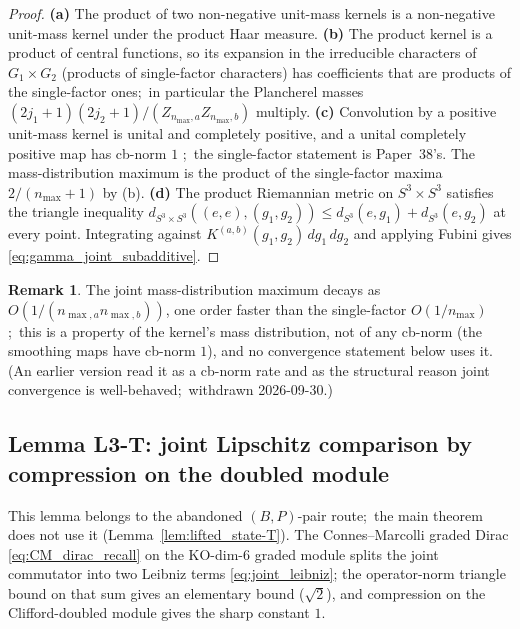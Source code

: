 \documentclass[11pt,a4paper]{article}
\theoremstyle{plain}
\theoremstyle{definition}
\newtheorem{remark}[theorem]{Remark}
\newcommand{\nmax}{n_{\max}}
\newcommand{\nmaxa}{n_{\max,a}}
\newcommand{\nmaxb}{n_{\max,b}}
\newcommand{\sthree}{S^{3}}
\newcommand{\KS}{K}
\begin{document}
\begin{proof}
\textbf{(a)} The product of two non-negative unit-mass kernels is a
non-negative unit-mass kernel under the product Haar measure.
\textbf{(b)} The product kernel is a product of central functions, so
its expansion in the irreducible characters of $G_1 \times G_2$
(products of single-factor characters) has coefficients that are
products of the single-factor ones;\ in particular the Plancherel
masses $(2j_1+1)(2j_2+1)/(Z_{\nmax,a} Z_{\nmax,b})$ multiply.
\textbf{(c)} Convolution by a positive unit-mass kernel is unital
and completely positive, and a unital completely positive map has
cb-norm $1$ \cite[Prop.~3.6]{paulsen2002};\ the single-factor statement is Paper~38's.
The mass-distribution maximum is the product of the single-factor
maxima $2/(\nmax + 1)$ by (b).
\textbf{(d)} The product Riemannian metric on $\sthree \times \sthree$
satisfies the triangle inequality $d_{\sthree \times \sthree}((e,e),
(g_1, g_2)) \le d_{\sthree}(e, g_1) + d_{\sthree}(e, g_2)$ at every
point. Integrating against $\KS^{(a,b)}(g_1, g_2) \,dg_1 \,dg_2$ and
applying Fubini gives \eqref{eq:gamma_joint_subadditive}.
\end{proof}

\begin{remark}\label{rem:cb_norm_rate}
The joint mass-distribution maximum decays as
$O(1/(\nmaxa \nmaxb))$, one order faster than the single-factor
$O(1/\nmax)$;\ this is a property of the kernel's mass distribution,
not of any cb-norm (the smoothing maps have cb-norm $1$), and no
convergence statement below uses it.  (An earlier version read it as
a cb-norm rate and as the structural reason joint convergence is
well-behaved;\ withdrawn 2026-09-30.)
\end{remark}

\subsection{Lemma L3-T: joint Lipschitz comparison by compression on the
doubled module}\label{sec:L3-T}

This lemma belongs to the abandoned $(B,P)$-pair route;\ the main
theorem does not use it (Lemma~\ref{lem:lifted_state-T}). The
Connes--Marcolli graded Dirac \eqref{eq:CM_dirac_recall} on the
KO-dim-6 graded module splits the joint commutator into two Leibniz
terms \eqref{eq:joint_leibniz}; the operator-norm triangle bound on
that sum gives an elementary bound ($\sqrt 2$), and compression on the
Clifford-doubled module gives the sharp constant $1$.
\end{document}
